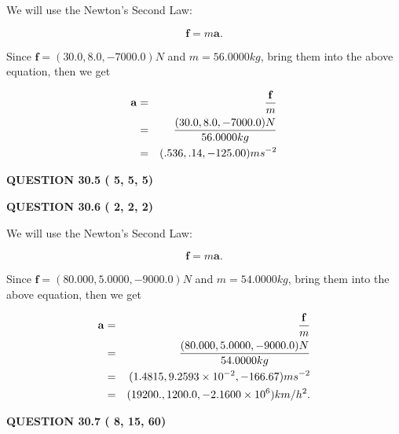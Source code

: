 \documentclass[12pt]{article}
\begin{document}
 
 

We will use the Newton's Second Law:
 
\[
\mathbf{f}=m\mathbf{a}.
\]
 
Since $\mathbf{f}= %
(30.0 , 8.0 , -7000.0) N$
and $m= %
56.0000kg$, bring them into the above equation, then we get
 
\begin{eqnarray*}
\mathbf{a}&=&\frac{\mathbf{f}}m  \\
&=&\frac{ %
(30.0 , 8.0 , -7000.0) N}{ %
56.0000kg}  \\
&=& %
(.536 , .14 , -125.00) ms^{-2}
\end{eqnarray*}
 
 
 
  
\vspace{0.2in}
  
{\textbf{\Large{QUESTION
30.5 
 (          5,          5,          5)
}}}
  
  
  
\vspace{0.2in}
  
{\textbf{\Large{QUESTION
30.6 
 (          2,          2,          2)
}}}
  
  
 
 

We will use the Newton's Second Law:
 
\[
\mathbf{f}=m\mathbf{a}.
\]
 
Since $\mathbf{f}=( %
80.000,  %
5.0000,  %
-9000.0 )N$
and $m= %
54.0000kg$, bring them into the above equation, then we get
 
\begin{eqnarray*}
\mathbf{a}&=&\frac{\mathbf{f}}m  \\
&=&\frac{(
80.000 ,
5.0000 ,
-9000.0 )N
}{ %
54.0000 kg}  \\
&=&(
1.4815 ,
9.2593 \times 10^{-2},
-166.67
)ms^{-2} \\
&=&(
19200. ,
1200.0 ,
-2.1600 \times 10^{6}
)km/h^2.
\end{eqnarray*}
 
 
 
  
\vspace{0.2in}
  
{\textbf{\Large{QUESTION
30.7 
 (          8,         15,         60)
}}}
  
  
 
 

 
 
  
\vspace{0.2in}
  
\end{document}
